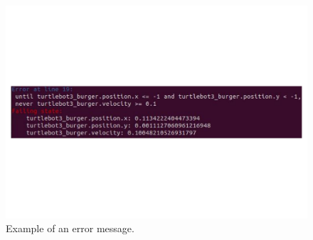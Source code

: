 \begin{figure}[h]
\includegraphics[width=\textwidth]{images/error_message.pdf}
\caption{Example of an error message.} \label{fig:monerror}
\end{figure}